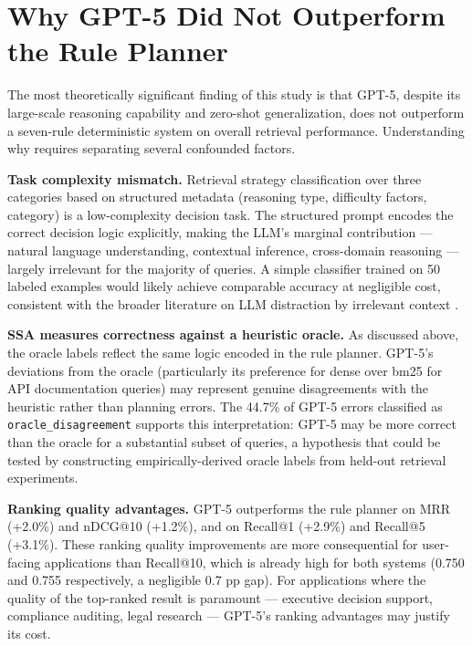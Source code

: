 \section{Why GPT-5 Did Not Outperform the Rule Planner}
\label{sec:disc_gpt5}

The most theoretically significant finding of this study is that GPT-5, despite its large-scale reasoning capability and zero-shot generalization, does not outperform a seven-rule deterministic system on overall retrieval performance. Understanding why requires separating several confounded factors.

\textbf{Task complexity mismatch.} Retrieval strategy classification over three categories based on structured metadata (reasoning type, difficulty factors, category) is a low-complexity decision task. The structured prompt encodes the correct decision logic explicitly, making the LLM's marginal contribution --- natural language understanding, contextual inference, cross-domain reasoning --- largely irrelevant for the majority of queries. A simple classifier trained on 50 labeled examples would likely achieve comparable accuracy at negligible cost, consistent with the broader literature on LLM distraction by irrelevant context \citep{shi2023large}.

\textbf{SSA measures correctness against a heuristic oracle.} As discussed above, the oracle labels reflect the same logic encoded in the rule planner. GPT-5's deviations from the oracle (particularly its preference for dense over bm25 for API documentation queries) may represent genuine disagreements with the heuristic rather than planning errors. The 44.7\% of GPT-5 errors classified as \texttt{oracle\_disagreement} supports this interpretation: GPT-5 may be more correct than the oracle for a substantial subset of queries, a hypothesis that could be tested by constructing empirically-derived oracle labels from held-out retrieval experiments.

\textbf{Ranking quality advantages.} GPT-5 outperforms the rule planner on MRR (+2.0\%) and nDCG@10 (+1.2\%), and on Recall@1 (+2.9\%) and Recall@5 (+3.1\%). These ranking quality improvements are more consequential for user-facing applications than Recall@10, which is already high for both systems (0.750 and 0.755 respectively, a negligible 0.7 pp gap). For applications where the quality of the top-ranked result is paramount --- executive decision support, compliance auditing, legal research --- GPT-5's ranking advantages may justify its cost.

